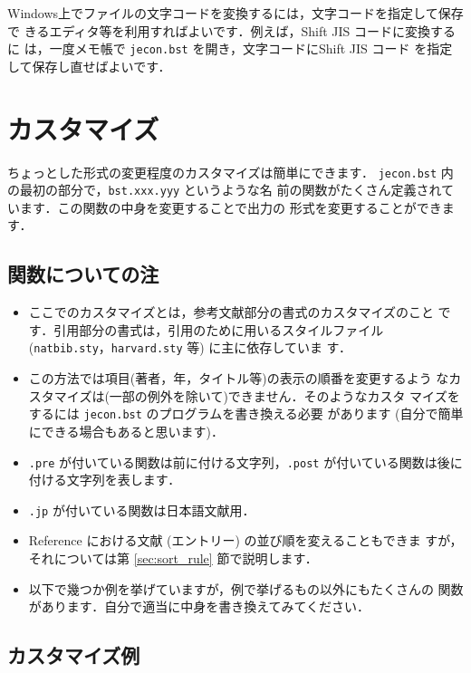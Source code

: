 \documentclass[a4j,10pt]{jarticle}
\begin{document}
Windows上でファイルの文字コードを変換するには，文字コードを指定して保存で
きるエディタ等を利用すればよいです．例えば，Shift JIS コードに変換するに
は，一度メモ帳で \texttt{jecon.bst} を開き，文字コードにShift JIS コード
を指定して保存し直せばよいです．

\section{カスタマイズ}

ちょっとした形式の変更程度のカスタマイズは簡単にできます．
\texttt{jecon.bst} 内の最初の部分で，\texttt{bst.xxx.yyy} というような名
前の関数がたくさん定義されています．この関数の中身を変更することで出力の
形式を変更することができます．

\subsection{関数についての注}

\begin{itemize}
 \item ここでのカスタマイズとは，参考文献部分の書式のカスタマイズのこと
       です．引用部分の書式は，引用のために用いるスタイルファイル 
       (\texttt{natbib.sty}，\texttt{harvard.sty} 等) に主に依存していま
       す．
 \item この方法では項目(著者，年，タイトル等)の表示の順番を変更するよう
       なカスタマイズは(一部の例外を除いて)できません．そのようなカスタ
       マイズをするには \texttt{jecon.bst} のプログラムを書き換える必要
       があります (自分で簡単にできる場合もあると思います)．
 \item \texttt{.pre} が付いている関数は前に付ける文字列，\texttt{.post} 
       が付いている関数は後に付ける文字列を表します．
 \item \texttt{.jp} が付いている関数は日本語文献用．
 \item Reference における文献 (エントリー) の並び順を変えることもできま
       すが，それについては第 \ref{sec:sort_rule} 節で説明します．
 \item 以下で幾つか例を挙げていますが，例で挙げるもの以外にもたくさんの
       関数があります．自分で適当に中身を書き換えてみてください．
\end{itemize}

\subsection{カスタマイズ例}
\end{document}
